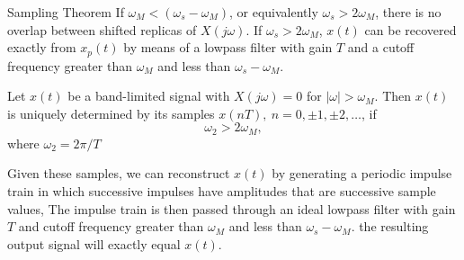 \begin{frame}{}

    \begin{center}
        
    \end{center}
\end{frame}

\begin{frame}{}
{
    \begin{center}
        
    \end{center}
}
\end{frame}

\begin{frame}{}
{
    \begin{center}
        
    \end{center}
}
\end{frame}


\begin{frame}{Sampling Theorem}
    If $\omega_M < (\omega_s - \omega_M)$, or equivalently $\omega_s > 2\omega_M$, there is no overlap between shifted replicas of $X(j\omega)$. If $\omega_s > 2\omega_M$, $x(t)$ can be recovered exactly from $x_p(t)$ by means of a lowpass filter with gain $T$ and a cutoff frequency greater than $\omega_M$ and less than $\omega_s - \omega_M$.
    \begin{theorem} \end{theorem}
    Let $x(t)$ be a band-limited signal with $X(j\omega) = 0$ for $|\omega| > \omega_M$. Then $x(t)$ is uniquely determined by its samples $x(nT), \: n = 0, \pm 1, \pm 2, \dots$, if
    \begin{equation*}
        \omega_2 > 2\omega_M,
    \end{equation*}
    where $\omega_2 = 2\pi/T$\par
    Given these samples, we can reconstruct $x(t)$ by generating a periodic impulse train in which successive impulses have amplitudes that are successive sample values, The impulse train is then passed through an ideal lowpass filter with gain $T$ and cutoff frequency greater than $\omega_M$ and less than $\omega_s - \omega_M$. the resulting output signal will exactly equal $x(t)$.
        

\end{frame}



\begin{frame}{}
    \begin{center}
        
    \end{center}
\end{frame}

